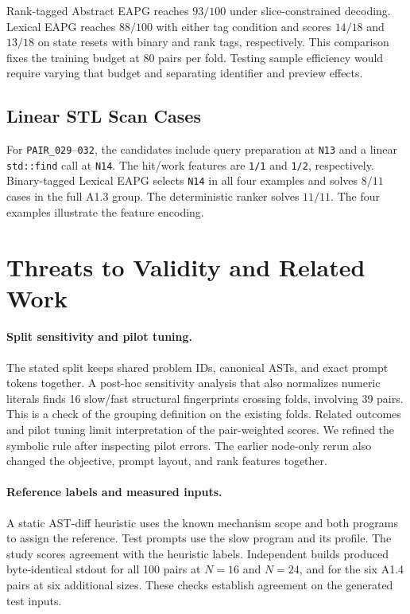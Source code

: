 \documentclass[10pt,conference]{IEEEtran}
\begin{document}
Rank-tagged Abstract EAPG reaches $93/100$ under slice-constrained decoding. Lexical EAPG reaches $88/100$ with either tag condition and scores $14/18$ and $13/18$ on state resets with binary and rank tags, respectively. This comparison fixes the training budget at 80 pairs per fold. Testing sample efficiency would require varying that budget and separating identifier and preview effects.

\subsection{Linear STL Scan Cases}
For \texttt{PAIR\_029}--\texttt{032}, the candidates include query preparation at \texttt{N13} and a linear \texttt{std::find} call at \texttt{N14}. The hit/work features are \texttt{1/1} and \texttt{1/2}, respectively. Binary-tagged Lexical EAPG selects \texttt{N14} in all four examples and solves $8/11$ cases in the full A1.3 group. The deterministic ranker solves $11/11$. The four examples illustrate the feature encoding.

\section{Threats to Validity and Related Work}
\label{sec:threats_to_validity}

\paragraph{Split sensitivity and pilot tuning.}
The stated split keeps shared problem IDs, canonical ASTs, and exact prompt tokens together. A post-hoc sensitivity analysis that also normalizes numeric literals finds 16 slow/fast structural fingerprints crossing folds, involving 39 pairs. This is a check of the grouping definition on the existing folds. Related outcomes and pilot tuning limit interpretation of the pair-weighted scores. We refined the symbolic rule after inspecting pilot errors. The earlier node-only rerun also changed the objective, prompt layout, and rank features together.

\paragraph{Reference labels and measured inputs.}
A static AST-diff heuristic uses the known mechanism scope and both programs to assign the reference. Test prompts use the slow program and its profile. The study scores agreement with the heuristic labels. Independent builds produced byte-identical stdout for all 100 pairs at $N=16$ and $N=24$, and for the six A1.4 pairs at six additional sizes. These checks establish agreement on the generated test inputs.
\end{document}
